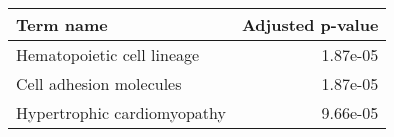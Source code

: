 \begin{tabular}{lr}
\toprule
                  Term name &  Adjusted p-value \\
\midrule
 Hematopoietic cell lineage &          1.87e-05 \\
    Cell adhesion molecules &          1.87e-05 \\
Hypertrophic cardiomyopathy &          9.66e-05 \\
\bottomrule
\end{tabular}

